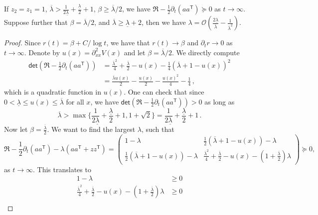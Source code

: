 \documentclass[11pt,reqno]{amsart}
\newcommand{\ts}{\mathsf{T}}
\def\pa{\partial}
\begin{document}
\begin{corollary}
{If $z_2 = z_1 = 1$,  $\overline{\lambda}>\frac{1}{2\underline{\lambda}}+\frac{\underline{\lambda}}{2}+1$, $\beta \geq \overline{\lambda}/2$, we have $\mathfrak R-\frac{1}{2}\partial_t(aa^{\ts})\succeq 0$ as $t\to \infty$. Suppose further that $\beta = \overline{\lambda}/2$, and $\overline{\lambda}\geq\underline\lambda+2$, then we have $\lambda = \mathcal{O}(\frac{2\underline{\lambda}}{\overline{\lambda}}-\frac{1}{\overline{\lambda}^2})$. }
\end{corollary}
{\begin{proof}
    Since $r(t)=\beta+C/\log t$, we have that $r(t) \to \beta$ and $\partial_t r \to 0$ as $t\to \infty$. Denote by $u(x) =\pa_{xx}^2V(x)$ and let $\beta = \overline{\lambda}/2$. We directly compute 
    \begin{align}
        \mathsf{det}(\mathfrak R-\frac{1}{2}\partial_t(aa^{\ts})) &= \frac{\overline{\lambda}^2}{4} + \frac{\overline{\lambda}}{2}-u(x)-\frac{1}{4}(\overline{\lambda}+1-u(x))^2\nonumber \\
        &= \frac{\overline{\lambda}u(x)}{2}-\frac{u(x)}{2}-\frac{u(x)^2}{4}-\frac{1}{4}\,,
    \end{align}
    which is a quadratic function in $u(x)$. One can check that since $0<\underline{\lambda}\leq u(x) \leq \overline{\lambda}$ for all $x$, we have $ \mathsf{det}(\mathfrak R-\frac{1}{2}\partial_t(aa^{\ts}))>0$ as long as 
    $$
    \overline{\lambda}>\max\{\frac{1}{2\underline{\lambda}}+\frac{\underline{\lambda}}{2}+1,1+\sqrt{2} \} = \frac{1}{2\underline{\lambda}}+\frac{\underline{\lambda}}{2}+1\,. 
    $$
    Now let $\beta = \frac{\overline{\lambda}}{2}$. We want to find the largest $\lambda$, such that 
    $$
\mathfrak R-\frac{1}{2}\partial_t(aa^{\ts})-\lambda (aa^{\ts}+zz^{\ts}) = \begin{pmatrix}
    1-\lambda & \frac{1}{2}(\overline{\lambda}+1-u(x))-\lambda \\
    \frac{1}{2}(\overline{\lambda}+1-u(x))-\lambda & \frac{\overline{\lambda}^2}{4}+ \frac{\overline{\lambda}}{2}-u(x)-(1+\frac{\overline{\lambda}}{2})\lambda 
\end{pmatrix}\succeq 0,
    $$
    as $t\to \infty$. This translates to 
    \begin{align}
        1-\lambda &\geq 0\label{condition1} \\
        \frac{\overline{\lambda}^2}{4}+ \frac{\overline{\lambda}}{2}-u(x)-(1+\frac{\overline{\lambda}}{2})\lambda &\geq0\label{condition2} \\

\end{align}
\end{proof}}
\end{document}
